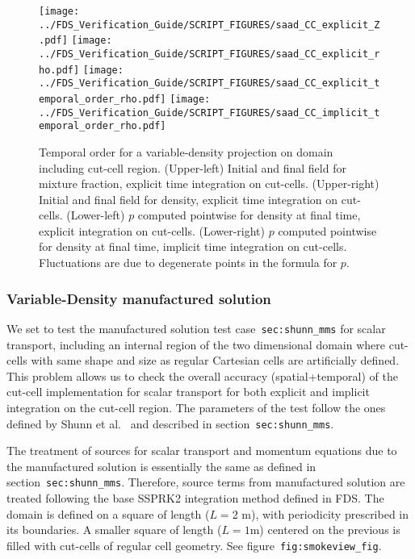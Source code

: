 \documentclass[12pt]{article}
\begin{document}
\begin{figure}[ht]
\centering
\texttt{[image: ../FDS\_Verification\_Guide/SCRIPT\_FIGURES/saad\_CC\_explicit\_Z.pdf]}
\texttt{[image: ../FDS\_Verification\_Guide/SCRIPT\_FIGURES/saad\_CC\_explicit\_rho.pdf]}
\texttt{[image: ../FDS\_Verification\_Guide/SCRIPT\_FIGURES/saad\_CC\_explicit\_temporal\_order\_rho.pdf]}
\texttt{[image: ../FDS\_Verification\_Guide/SCRIPT\_FIGURES/saad\_CC\_implicit\_temporal\_order\_rho.pdf]}
\caption[The {\ct saad CC} temporal order test case]{Temporal order for a variable-density projection on domain including cut-cell region.  (Upper-left) Initial and final field for mixture fraction, explicit time integration on cut-cells.  (Upper-right) Initial and final field for density, explicit time integration on cut-cells.  (Lower-left) $p$ computed pointwise for density at final time, explicit integration on cut-cells. (Lower-right) $p$ computed pointwise for density at final time, implicit time integration on cut-cells.  Fluctuations are due to degenerate points in the formula for $p$.}\label{fig:saad_cc_temporal_order}
\end{figure}


\subsubsection{Variable-Density manufactured solution}

\label{sec:shunn_cc_mms}


We set to test the manufactured solution test case~\texttt{sec:shunn\_mms} for scalar transport, including an internal region of the two dimensional domain where cut-cells with same shape and size as regular Cartesian cells are artificially defined. This problem allows us to check the overall accuracy (spatial+temporal) of the cut-cell implementation for scalar transport for both explicit and implicit integration on the cut-cell region.
The parameters of the test follow the ones defined by Shunn et al.~\cite{Shunn:2012} and described in section~\texttt{sec:shunn\_mms}.

The treatment of sources for scalar transport and momentum equations due to the manufactured solution is essentially the same as defined in section~\texttt{sec:shunn\_mms}. Therefore, source terms from manufactured solution are treated following the base SSPRK2 integration method defined in FDS.
The domain is defined on a square of length ($L=2$ m), with periodicity prescribed in its boundaries. A smaller square of length ($L=1$m) centered on the previous is filled with cut-cells of regular cell geometry. See figure~\texttt{fig:smokeview\_fig}.
\end{document}
